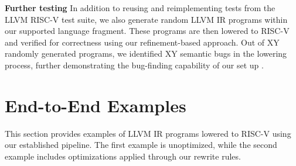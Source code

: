 \textbf{Further testing }
 In addition to reusing and reimplementing tests from the LLVM RISC-V test suite, we also generate random LLVM IR programs within our supported language fragment. These programs are then lowered to RISC-V and verified for correctness using our refinement-based approach. Out of XY randomly generated programs, we identified XY semantic bugs in the lowering process, further demonstrating the bug-finding capability of our set up
 .
\section{End-to-End Examples}
This section provides examples of LLVM IR programs lowered to RISC-V using our established pipeline. The first example is unoptimized, while the second example includes optimizations applied through our rewrite rules.